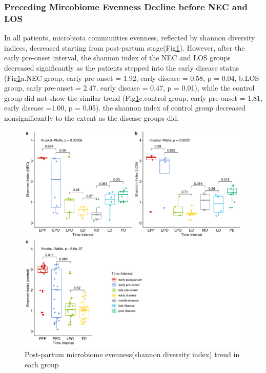 \documentclass[fleqn,10pt,lineno]{wlpeerj} %
\begin{document}
    \subsubsection*{Preceding Mircobiome Evenness Decline before NEC and LOS}
    In all patients, microbiota communities evenness, reflected by shannon diversity indices, decreased starting from post-partum stage(Fig\ref{fig:shannon-group-time}). However, after the early pre-onset interval, the shannon index of the NEC and LOS groups decreased significantly as the patients stepped into the early disease status (Fig\ref{fig:shannon-group-time}a.NEC group, early pre-onset = 1.92, early disease = 0.58, p = 0.04, b.LOS group, early pre-onset = 2.47, early disease = 0.47, p = 0.01), while the control group did not show the similar trend (Fig\ref{fig:shannon-group-time}c.control group, early pre-onset = 1.81, early disease =1.00, p = 0.05). the shannon index of control group decreased nonsignificantly to the extent as the disease groups did.
    \begin{figure}[ht]\centering
      \includegraphics[width=\linewidth]{figure/shannon-group-time.pdf}
      \caption{Post-partum microbiome evenness(shannon diversity index) trend in each group}
      \label{fig:shannon-group-time}
    \end{figure}
\end{document}

